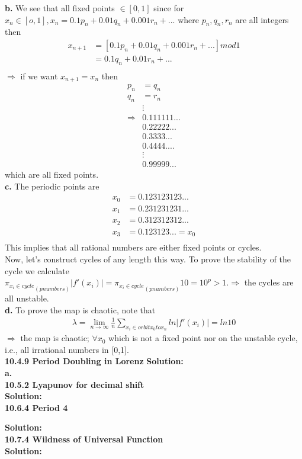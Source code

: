 \documentclass[12pt]{article}
\begin{document}
{\bf b. } We see that all fixed points $\in [0,1]$ since for $x_n \in [o,1], x_n=0.1 p_n+0.01q_n+0.001r_n+...$ where $p_n,q_n,r_n$ are all integers then \\
\begin{align*}
x_{n+1}&=[0.1 p_n+0.01q_n+0.001r_n+...]mod1\\
&=0.1 q_n+0.01r_n+...\\
\end{align*} 
$\Rightarrow$ if we want $x_{n+1}=x_n$ then \\
\begin{align*}
p_n &=q_n\\            
q_n &=r_n \\
&\vdots\\
\Rightarrow & 0.111111...\\
& 0.22222...\\
& 0.3333...\\
& 0.4444....\\
& \vdots \\
& 0.99999...
\end{align*}
which are all fixed points.\\
{\bf c. } The periodic points are \\
\begin{align*}
x_0&=0.123123123...\\
x_1&=0.231231231...\\
x_2&=0.312312312...\\
x_3&=0.123123...=x_0\\
\end{align*} 
This implies that all rational numbers are either fixed points or cycles.\\
Now, let's construct cycles of any length this way. To prove the stability of the cycle we calculate ${\pi_{x_i \in cycle}}_{\left(p numbers\right)} |f'(x_i)|= {\pi_{x_i \in cycle}}_{\left(p numbers\right)} 10 =10^p >1. \Rightarrow$ the cycles are all unstable.\\
{\bf d. } To prove the map is chaotic, note that 
\begin{align*}
\lambda=\lim_{n\to\infty} \frac{1}{n} \sum_{x_i \in orbit x_0 to x_n} ln |f'(x_i)|=ln 10 
\end{align*}
$\Rightarrow$ the map is chaotic; $\forall x_0$ which is not a fixed point nor on the unstable cycle, i.e., all irrational numbers in [0,1].\\
\noindent
{\bf 10.4.9 Period Doubling in Lorenz} 
{\bf Solution:}\\
\indent
{\bf a. } \\

{\bf 10.5.2 Lyapunov for decimal shift } \\
{\bf Solution: }\\

\bigskip\noindent
{\bf 10.6.4 Period 4}\\
\bigskip

{\bf Solution:}\\

\noindent
{\bf 10.7.4 Wildness of Universal Function }\\
{\bf Solution: }
\end{document}

